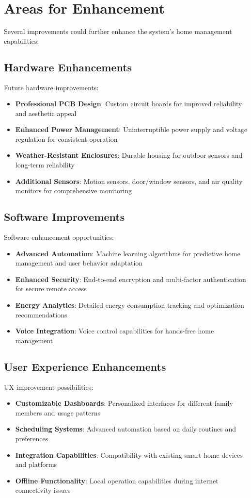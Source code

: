 \documentclass[12pt,a4paper]{report}
\begin{document}
\section{Areas for Enhancement}

\noindent Several improvements could further enhance the system's home management capabilities:

\subsection{Hardware Enhancements}
\noindent Future hardware improvements:
\begin{itemize}
\item \textbf{Professional PCB Design}: Custom circuit boards for improved reliability and aesthetic appeal
\item \textbf{Enhanced Power Management}: Uninterruptible power supply and voltage regulation for consistent operation
\item \textbf{Weather-Resistant Enclosures}: Durable housing for outdoor sensors and long-term reliability
\item \textbf{Additional Sensors}: Motion sensors, door/window sensors, and air quality monitors for comprehensive monitoring
\end{itemize}

\subsection{Software Improvements}
\noindent Software enhancement opportunities:
\begin{itemize}
\item \textbf{Advanced Automation}: Machine learning algorithms for predictive home management and user behavior adaptation
\item \textbf{Enhanced Security}: End-to-end encryption and multi-factor authentication for secure remote access
\item \textbf{Energy Analytics}: Detailed energy consumption tracking and optimization recommendations
\item \textbf{Voice Integration}: Voice control capabilities for hands-free home management
\end{itemize}

\subsection{User Experience Enhancements}
\noindent UX improvement possibilities:
\begin{itemize}
\item \textbf{Customizable Dashboards}: Personalized interfaces for different family members and usage patterns
\item \textbf{Scheduling Systems}: Advanced automation based on daily routines and preferences
\item \textbf{Integration Capabilities}: Compatibility with existing smart home devices and platforms
\item \textbf{Offline Functionality}: Local operation capabilities during internet connectivity issues
\end{itemize}
\end{document}
